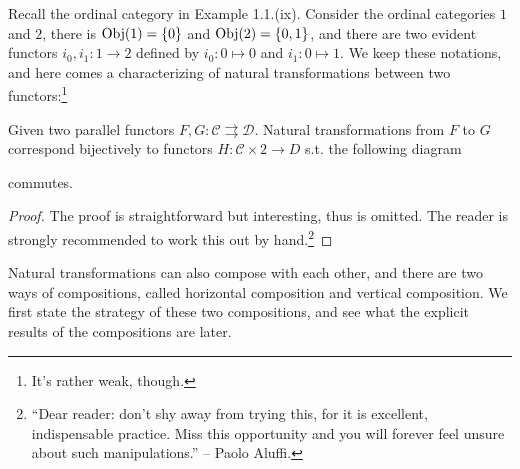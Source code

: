 	Recall the ordinal category in Example 1.1.(ix). Consider the ordinal categories $\mathrm{1}$ and $\mathrm{2}$, there is $\operatorname{Obj}(\mathrm{1})=\{0\}$ and $\operatorname{Obj}(\mathrm{2})=\{0,1\}$, and there are two evident functors $i_0,i_1:\mathrm{1}\to\mathrm{2}$ defined by $i_0:0\mapsto 0$ and $i_1:0\mapsto 1$. We keep these notations, and here comes a characterizing of natural transformations between two functors:\footnote{It's rather weak, though.}
	\begin{lemma}
	Given two parallel functors $F,G:\mathcal{C}\rightrightarrows \mathcal{D}$. Natural transformations from $F$ to $G$ correspond bijectively to functors $H:\mathcal{C}\times \mathrm{2}\to D$ s.t. the following diagram
	\begin{center}
		\end{center}
		commutes.
	\end{lemma}
	\begin{proof}
	The proof is straightforward but interesting, thus is omitted. The reader is strongly recommended to work this out by hand.\footnote{``Dear reader: don't shy away from trying this, for it is excellent, indispensable practice. Miss this opportunity and you will forever feel unsure about such manipulations.'' -- Paolo Aluffi.}
	\end{proof}
	Natural transformations can also compose with each other, and there are two ways of compositions, called horizontal composition and vertical composition. We first state the strategy of these two compositions, and see what the explicit results of the compositions are later.

